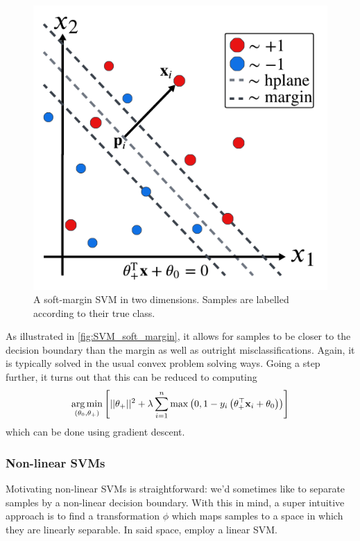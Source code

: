 \documentclass[11pt]{article}
\begin{document}
\begin{figure}[t]
    \centering
    \begin{minipage}{0.62\linewidth}
        \includegraphics[width=\linewidth]{./figures/supervised_learning/SVM_soft_margin.pdf}
    \end{minipage}%
    \hfill
    \begin{minipage}{0.35\linewidth}
        \caption{A soft-margin SVM in two dimensions. Samples are labelled according to their true class.}
        \label{fig:SVM_soft_margin}
    \end{minipage}
\end{figure}

As illustrated in \autoref{fig:SVM_soft_margin}, it allows for samples to be closer to the decision boundary than the margin as well as outright misclassifications. Again, it is typically solved in the usual convex problem solving ways. Going a step further, it turns out that this can be reduced to computing
$$
\operatorname*{arg\,min}_{(\theta_0,\theta_+)}\left[||\theta_+||^2+\lambda\sum_{i=1}^n\max\left(0,1-y_i\left(\theta_+^\top \mathbf{x}_i+\theta_0\right)\right)\right]
$$
which can be done using gradient descent.

\subsubsection{Non-linear SVMs}
Motivating non-linear SVMs is straightforward: we'd sometimes like to separate samples by a non-linear decision boundary. With this in mind, a super intuitive approach is to find a transformation $\phi$ which maps samples to a space in which they are linearly separable. In said space, employ a linear SVM.
\end{document}
